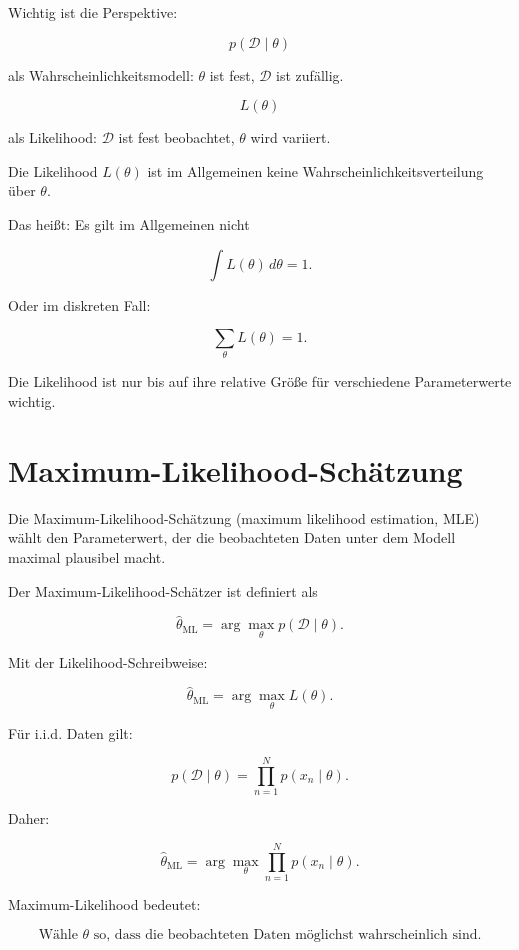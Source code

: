 Wichtig ist die Perspektive:

\[
    p(\mathcal{D} \mid \theta)
\]

als Wahrscheinlichkeitsmodell:
\(\theta\) ist fest, \(\mathcal{D}\) ist zufällig.

\[
    L(\theta)
\]

als Likelihood:
\(\mathcal{D}\) ist fest beobachtet, \(\theta\) wird variiert.

\begin{notebox}
Die Likelihood \(L(\theta)\) ist im Allgemeinen keine Wahrscheinlichkeitsverteilung über \(\theta\).

Das heißt:
Es gilt im Allgemeinen nicht

\[
    \int L(\theta)\,d\theta = 1.
\]

Oder im diskreten Fall:

\[
    \sum_{\theta} L(\theta) = 1.
\]

Die Likelihood ist nur bis auf ihre relative Größe für verschiedene Parameterwerte wichtig.
\end{notebox}

\section{Maximum-Likelihood-Schätzung}

Die Maximum-Likelihood-Schätzung (maximum likelihood estimation, MLE) wählt den Parameterwert, der die beobachteten Daten unter dem Modell maximal plausibel macht.

\begin{definitionbox}
Der Maximum-Likelihood-Schätzer ist definiert als

\[
    \hat{\theta}_{\mathrm{ML}}
    =
    \arg\max_{\theta}
    p(\mathcal{D} \mid \theta).
\]

Mit der Likelihood-Schreibweise:

\[
    \hat{\theta}_{\mathrm{ML}}
    =
    \arg\max_{\theta}
    L(\theta).
\]
\end{definitionbox}

Für i.i.d. Daten gilt:

\[
    p(\mathcal{D} \mid \theta)
    =
    \prod_{n=1}^{N}
    p(x_n \mid \theta).
\]

Daher:

\[
    \hat{\theta}_{\mathrm{ML}}
    =
    \arg\max_{\theta}
    \prod_{n=1}^{N}
    p(x_n \mid \theta).
\]

\begin{conceptbox}
Maximum-Likelihood bedeutet:

\[
    \text{Wähle } \theta \text{ so, dass die beobachteten Daten möglichst wahrscheinlich sind.}
\]
\end{conceptbox}

